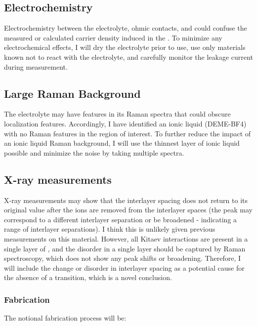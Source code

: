 \documentclass[11pt]{article}
\begin{document}
\subsection{Electrochemistry}

Electrochemistry between the electrolyte, ohmic contacts, and \rucl could confuse the measured or calculated carrier density induced in the \ruclnospace. To minimize any electrochemical effects, I will dry the electrolyte prior to use, use only materials known not to react with the electrolyte, and carefully monitor the leakage current during measurement.

\subsection{Large Raman Background}

The electrolyte may have features in its Raman spectra that could obscure localization features. Accordingly, I have identified an ionic liquid (DEME-BF4) with no Raman features in the region of interest. To further reduce the impact of an ionic liquid Raman background, I will use the thinnest layer of ionic liquid possible and minimize the noise by taking multiple spectra.

\subsection{X-ray measurements}

X-ray measurements may show that the interlayer spacing does not return to its original value after the ions are removed from the interlayer spaces (the peak may correspond to a different interlayer separation or be broadened - indicating a range of interlayer separations). I think this is unlikely given previous measurements on this material. However, all Kitaev interactions are present in a single layer of \ruclnospace , and the disorder in a single layer should be captured by Raman spectroscopy, which does not show any peak shifts or broadening. Therefore, I will include the change or disorder in interlayer spacing as a potential cause for the absence of a transition, which is a novel conclusion. 

\subsubsection{Fabrication}

The notional fabrication process will be:
\end{document}
